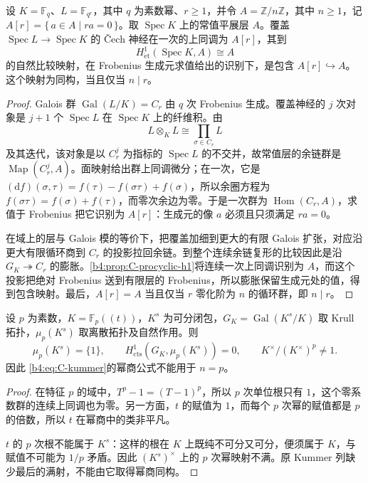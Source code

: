 \begin{proposition}\label{b4:prop:C-finite-galois-cover-h1}
	设 \(K=\mathbb F_q\)、\(L=\mathbb F_{q^r}\)，其中 \(q\) 为素数幂、\(r\ge1\)，并令 \(A=\mathbb Z/n\mathbb Z\)，其中 \(n\ge1\)，记 \(A[r]=\{\,a\in A\mid ra=0\,\}\)。取 \(\operatorname{Spec}K\) 上的常值平展层 \(A\)。覆盖 \(\operatorname{Spec}L\to\operatorname{Spec}K\) 的 Čech 神经在一次的上同调为 \(A[r]\)，其到
	\[
		H^1_{\mathrm{\acute et}}(\operatorname{Spec}K,A)\cong A
	\]
	的自然比较映射，在 Frobenius 生成元求值给出的识别下，是包含 \(A[r]\hookrightarrow A\)。这个映射为同构，当且仅当 \(n\mid r\)。
\end{proposition}
\begin{proof}
	Galois 群 \(\operatorname{Gal}(L/K)=C_r\) 由 \(q\) 次 Frobenius 生成。覆盖神经的 \(j\) 次对象是 \(j+1\) 个 \(\operatorname{Spec}L\) 在 \(\operatorname{Spec}K\) 上的纤维积。由
	\[
		L\otimes_KL\cong\prod_{\sigma\in C_r}L
	\]
	及其迭代，该对象是以 \(C_r^j\) 为指标的 \(\operatorname{Spec}L\) 的不交并，故常值层的余链群是 \(\operatorname{Map}(C_r^j,A)\)。面映射给出群上同调微分；在一次，它是 \((\mathrm{d}f)(\sigma,\tau)=f(\tau)-f(\sigma\tau)+f(\sigma)\)，所以余圈方程为 \(f(\sigma\tau)=f(\sigma)+f(\tau)\)，而零次余边为零。于是一次群为 \(\operatorname{Hom}(C_r,A)\)，求值于 Frobenius 把它识别为 \(A[r]\)：生成元的像 \(a\) 必须且只须满足 \(ra=0\)。

	在域上的层与 Galois 模的等价下，把覆盖加细到更大的有限 Galois 扩张，对应沿更大有限循环商到 \(C_r\) 的投影拉回余链。到整个连续余链复形的比较因此是沿 \(G_K\twoheadrightarrow C_r\) 的膨胀。\cref{b4:prop:C-procyclic-h1}将连续一次上同调识别为 \(A\)，而这个投影把绝对 Frobenius 送到有限层的 Frobenius，所以膨胀保留生成元处的值，得到包含映射。最后，\(A[r]=A\) 当且仅当 \(r\) 零化阶为 \(n\) 的循环群，即 \(n\mid r\)。
\end{proof}

\begin{proposition}\label{b4:prop:C-inseparable-kummer-boundary}
	设 \(p\) 为素数，\(K=\mathbb F_p(\!(t)\!)\)，\(K^s\) 为可分闭包，\(G_K=\operatorname{Gal}(K^s/K)\) 取 Krull 拓扑，\(\mu_p(K^s)\) 取离散拓扑及自然作用。则
	\[
		\mu_p(K^s)=\{1\},\qquad H^1_{\mathrm{cts}}(G_K,\mu_p(K^s))=0, \qquad K^\times/(K^\times)^p\ne1.
	\]
	因此 \eqref{b4:eq:C-kummer}的幂商公式不能用于 \(n=p\)。
\end{proposition}
\begin{proof}
	在特征 \(p\) 的域中，\(T^p-1=(T-1)^p\)，所以 \(p\) 次单位根只有 \(1\)，这个零系数群的连续上同调也为零。另一方面，\(t\) 的赋值为 \(1\)，而每个 \(p\) 次幂的赋值都是 \(p\) 的倍数，所以 \(t\) 在幂商中的类非平凡。

	\(t\) 的 \(p\) 次根不能属于 \(K^s\)：这样的根在 \(K\) 上既纯不可分又可分，便须属于 \(K\)，与赋值不可能为 \(1/p\) 矛盾。因此 \((K^s)^\times\) 上的 \(p\) 次幂映射不满。原 Kummer 列缺少最后的满射，不能由它取得幂商同构。
\end{proof}

